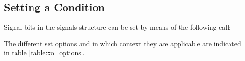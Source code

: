 
\subsection{Setting a Condition}

Signal bits in the signals structure can be set by means of the following
call:


The different set options and in which context they are applicable are indicated in table
\ref{table:xo_options}.














